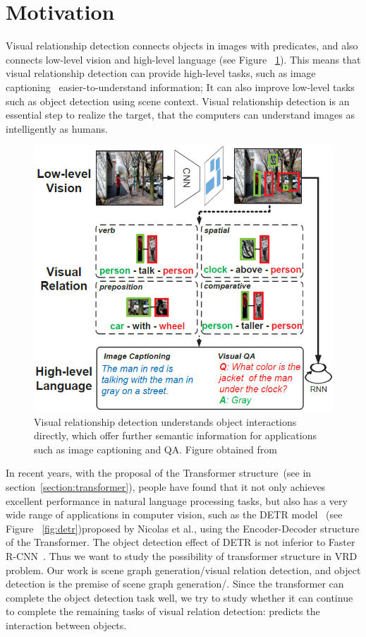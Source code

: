 \section{Motivation}

Visual relationship detection connects objects in images with predicates, and also connects low-level vision and high-level language (see Figure ~\ref{fig:vrd}). This means that visual relationship detection can provide high-level tasks, such as image captioning~\cite{hossain2019comprehensive} easier-to-understand information; It can also improve low-level tasks such as object detection using scene context. Visual relationship detection is an essential step to realize the target, that the computers can understand images as intelligently as humans.

\begin{figure}[!htbp]
	\centering
	\includegraphics[width = 0.7 \textwidth]{figures/VRD.png}
	\caption[Connection between low-level vision and high-level vision]
	{ Visual relationship detection understands object interactions directly, which offer further semantic information for applications such as image captioning and QA. Figure obtained from ~\cite{zhang2017visual}}
	\label{fig:vrd}
\end{figure}

In recent years, with the proposal of the Transformer structure~\cite{vaswani2017attention}(see in section~\ref{section:transformer}), people have found that it not only achieves excellent performance in natural language processing tasks, but also has a very wide range of applications in computer vision, such as the DETR model~\cite{carion2020end} (see Figure ~\ref{fig:detr})proposed by Nicolas et al., using the Encoder-Decoder structure of the Transformer. The object detection effect of DETR is not inferior to Faster R-CNN~\cite{ren2016faster}. Thus we want to study the possibility of transformer structure in VRD problem. Our work is scene graph generation/visual relation detection, and object detection is the premise of scene graph generation/. Since the transformer can complete the object detection task well, we try to study whether it can continue to complete the remaining tasks of visual relation detection: predicts the interaction between objects.

